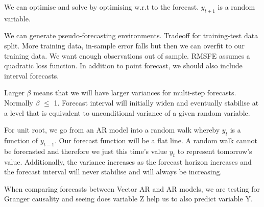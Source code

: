 \documentclass[11pt, oneside]{article}
\theoremstyle{definition}
\begin{document}
We can optimise and solve by optimising w.r.t to the forecast. $y_{t+1}$ is a random variable.

We can generate pseudo-forecasting environments. Tradeoff for training-test data split. More training data, in-sample error falls but then we can overfit to our training data. We want enough observations out of sample. RMSFE assumes a quadratic loss function. In addition to point forecast, we should also include interval forecasts.

Larger $\beta$ means that we will have larger variances for multi-step forecasts. Normally $\beta$ $\leq$ 1. Forecast interval will initially widen and eventually stabilise at a level that is equivalent to unconditional variance of a given random variable.

For unit root, we go from an AR model into a random walk whereby $y_t$ is a function of $y_{t-1}$. Our forecast function will be a flat line. A random walk cannot be forecasted and therefore we just this time's value $y_t$ to represent tomorrow's value. Additionally, the variance increases as the forecast horizon increases and the forecast interval will never stabilise and will always be increasing.

When comparing forecasts between Vector AR and AR models, we are testing for Granger causality and seeing does variable Z help us to also predict variable Y.
\end{document}
